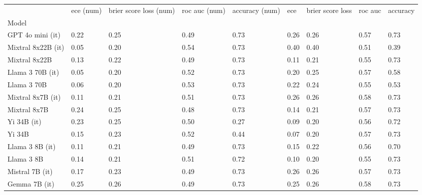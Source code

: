 \begin{tabular}{lllllllll}
\toprule
 & ece (num) & brier score loss (num) & roc auc (num) & accuracy (num) & ece & brier score loss & roc auc & accuracy \\
Model &  &  &  &  &  &  &  &  \\
\midrule
GPT 4o mini (it) & 0.22 & 0.25 & 0.49 & \cellcolor{cyan!25.0} 0.73 & 0.26 & 0.26 & \cellcolor{cyan!0.6} 0.57 & \cellcolor{cyan!25.0} 0.73 \\
Mixtral 8x22B (it) & 0.05 & \cellcolor{cyan!17.9} 0.20 & \cellcolor{cyan!25.0} 0.54 & \cellcolor{cyan!25.0} 0.73 & 0.40 & 0.40 & \cellcolor{orange!12.8} 0.51 & 0.39 \\
Mixtral 8x22B & 0.13 & 0.22 & 0.49 & \cellcolor{cyan!25.0} 0.73 & \cellcolor{cyan!10.2} 0.11 & \cellcolor{cyan!21.2} 0.21 & 0.55 & \cellcolor{cyan!25.0} 0.73 \\
Llama 3 70B (it) & 0.05 & \cellcolor{cyan!10.7} 0.20 & 0.52 & \cellcolor{cyan!25.0} 0.73 & 0.20 & \cellcolor{cyan!1.5} 0.25 & 0.57 & 0.58 \\
Llama 3 70B & 0.06 & \cellcolor{cyan!7.1} 0.20 & 0.53 & \cellcolor{cyan!20.7} 0.73 & 0.22 & \cellcolor{cyan!4.8} 0.24 & 0.55 & 0.53 \\
Mixtral 8x7B (it) & 0.11 & 0.21 & 0.51 & \cellcolor{cyan!25.0} 0.73 & 0.26 & 0.26 & \cellcolor{cyan!12.8} 0.58 & \cellcolor{cyan!25.0} 0.73 \\
Mixtral 8x7B & 0.24 & 0.25 & \cellcolor{orange!25.0} 0.48 & \cellcolor{cyan!25.0} 0.73 & \cellcolor{cyan!0.8} 0.14 & \cellcolor{cyan!18.9} 0.21 & 0.57 & \cellcolor{cyan!25.0} 0.73 \\
Yi 34B (it) & 0.23 & 0.25 & 0.50 & \cellcolor{orange!25.0} 0.27 & \cellcolor{cyan!18.2} 0.09 & \cellcolor{cyan!23.1} 0.20 & 0.56 & \cellcolor{cyan!15.4} 0.72 \\
Yi 34B & 0.15 & 0.23 & 0.52 & 0.44 & \cellcolor{cyan!25.0} 0.07 & \cellcolor{cyan!25.0} 0.20 & 0.57 & \cellcolor{cyan!20.7} 0.73 \\
Llama 3 8B (it) & 0.11 & 0.21 & 0.49 & \cellcolor{cyan!23.4} 0.73 & 0.15 & \cellcolor{cyan!13.7} 0.22 & 0.56 & \cellcolor{cyan!5.3} 0.70 \\
Llama 3 8B & 0.14 & 0.21 & 0.51 & \cellcolor{cyan!19.1} 0.72 & \cellcolor{cyan!12.5} 0.10 & \cellcolor{cyan!21.7} 0.20 & 0.55 & \cellcolor{cyan!24.5} 0.73 \\
Mistral 7B (it) & 0.17 & 0.23 & 0.49 & \cellcolor{cyan!24.5} 0.73 & 0.26 & 0.26 & 0.57 & \cellcolor{cyan!25.0} 0.73 \\
Gemma 7B (it) & \cellcolor{orange!8.9} 0.25 & 0.26 & \cellcolor{orange!3.1} 0.49 & \cellcolor{cyan!22.3} 0.73 & 0.25 & 0.26 & \cellcolor{cyan!25.0} 0.58 & \cellcolor{cyan!21.8} 0.73 \\

\end{tabular}

